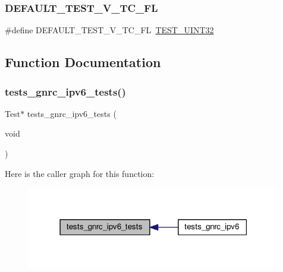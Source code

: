 \subsubsection{\texorpdfstring{D\+E\+F\+A\+U\+L\+T\+\_\+\+T\+E\+S\+T\+\_\+\+V\+\_\+\+T\+C\+\_\+\+FL}{DEFAULT\_TEST\_V\_TC\_FL}}
{\footnotesize\ttfamily \#define D\+E\+F\+A\+U\+L\+T\+\_\+\+T\+E\+S\+T\+\_\+\+V\+\_\+\+T\+C\+\_\+\+FL~\hyperlink{unittests-constants_8h_a7504d2f34f62312f47d31a9a8c385961}{T\+E\+S\+T\+\_\+\+U\+I\+N\+T32}}



\subsection{Function Documentation}
\mbox{\label{tests-gnrc__ipv6_8c_aa6f48b3c3bc37d990284a77ede0a3d72}} 
\subsubsection{\texorpdfstring{tests\+\_\+gnrc\+\_\+ipv6\+\_\+tests()}{tests\_gnrc\_ipv6\_tests()}}
{\footnotesize\ttfamily Test$\ast$ tests\+\_\+gnrc\+\_\+ipv6\+\_\+tests (\begin{DoxyParamCaption}\item[{void}]{ }\end{DoxyParamCaption})}

Here is the caller graph for this function\+:
\nopagebreak
\begin{figure}[H]
\begin{center}
\leavevmode
\includegraphics[width=315pt]{tests-gnrc__ipv6_8c_aa6f48b3c3bc37d990284a77ede0a3d72_icgraph}
\end{center}
\end{figure}
